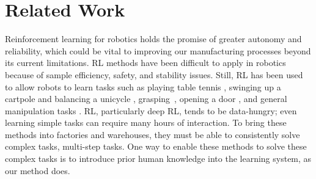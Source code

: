\section{Related Work}\label{sec:related_work}

Reinforcement learning for robotics holds the promise of greater autonomy and reliability, which could be vital to improving our manufacturing processes beyond its current limitations.
RL methods have been difficult to apply in robotics because of sample efficiency, safety, and stability issues. Still, RL has been used to allow robots to learn tasks such as playing table tennis \citep{peters2010reps}, swinging up a cartpole and balancing a unicycle \citep{deisenroth2011pilco}, grasping~\citep{pinto2017robust, levine2017grasping}, opening a door \citep{Gu2016b}, and general manipulation tasks \citep{levine2016gps, haarnoja2018sac}. RL, particularly deep RL, tends to be data-hungry; even learning simple tasks can require many hours of interaction. To bring these methods into factories and warehouses, they must be able to consistently solve complex tasks, multi-step tasks. One way to enable these methods to solve these complex tasks is to introduce prior human knowledge into the learning system, as our method does.

